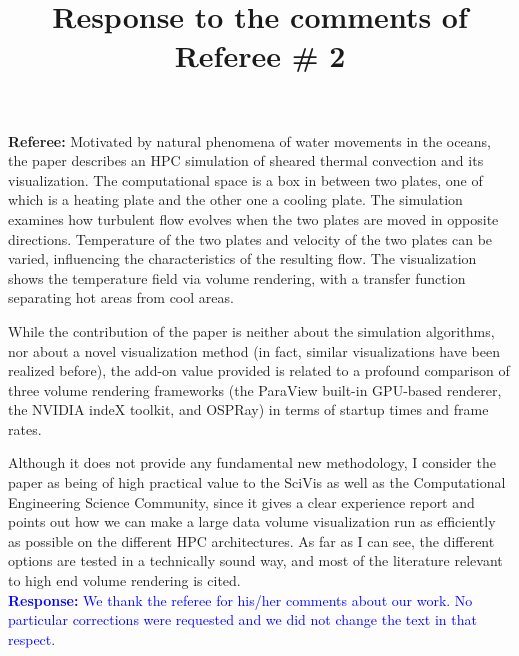 \documentclass[]{article}
\title{Response to the comments of Referee \# 2}
\begin{document}
\maketitle

\textbf{Referee:} Motivated by natural phenomena of water movements in the oceans, the paper describes an HPC simulation of sheared thermal convection and its visualization. The computational space is a box in between two plates, one of which is a heating plate and the other one a cooling plate. The simulation examines how turbulent flow evolves when the two plates are moved in opposite directions. Temperature of the two plates and velocity of the two plates can be varied, influencing the characteristics of the resulting flow.  The visualization shows the temperature field via volume rendering, with a transfer function separating hot areas from cool areas.

While the contribution of the paper is neither about the simulation algorithms, nor about a novel visualization method (in fact, similar visualizations have been realized before), the add-on value provided is related to a profound comparison of three volume rendering frameworks (the ParaView built-in GPU-based renderer, the NVIDIA indeX toolkit, and OSPRay) in terms of startup times and frame rates.

Although it does not provide any fundamental new methodology, I consider the paper as being of high practical value to the SciVis as well as the Computational Engineering Science Community, since it gives a clear experience report and points out how we can make a large data volume visualization run as efficiently as possible on the different HPC architectures. As far as I can see, the different options are tested in a technically sound way, and most of the literature relevant to high end volume rendering is cited.\\

\textcolor{blue}{\textbf{Response:} We thank the referee for his/her comments about our work. No particular corrections were requested and we did not change the text in that respect.}
\end{document}
